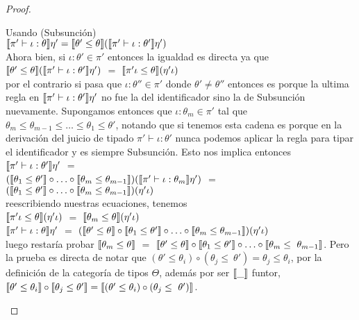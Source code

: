 \begin{proof}
\begin{itemize}
\begin{itemize}
Usando (Subsunción)\\

$\llbracket \pi' \vdash \iota : \theta \rrbracket\eta' = 
\llbracket \theta' \leq \theta \rrbracket (\llbracket \pi' \vdash \iota : \theta' \rrbracket\eta')$\\

Ahora bien, si $\iota:\theta' \in \pi'$ entonces la igualdad es directa ya que\\

$\llbracket \theta' \leq \theta \rrbracket (\llbracket \pi' \vdash \iota : \theta' \rrbracket\eta')$ $=$
$\llbracket \pi'\iota \leq \theta \rrbracket (\eta'\iota)$\\

por el contrario si pasa que $\iota:\theta'' \in \pi'$ donde $\theta' \neq \theta''$
entonces es porque la ultima regla en $\llbracket \pi' \vdash \iota : \theta' \rrbracket\eta'$
no fue la del identificador sino la de Subsunción nuevamente. Supongamos entonces
que $\iota:\theta_m \in \pi'$ tal que 
$\theta_m \leq \theta_{m-1} \leq \ldots \leq \theta_1 \leq \theta'$, notando que
si tenemos esta cadena es porque en la derivaci\'on del juicio de tipado 
$\pi' \vdash \iota : \theta'$ nunca podemos aplicar la regla para tipar el identificador
y es siempre Subsunción. Esto nos implica entonces\\

$\llbracket \pi' \vdash \iota : \theta' \rrbracket\eta'$ $=$\\
$(\llbracket \theta_1 \leq \theta' \rrbracket \circ 
\ldots 
\circ \llbracket \theta_m \leq \theta_{m-1} \rrbracket)
		(\llbracket \pi' \vdash \iota : \theta_m \rrbracket\eta')$ $=$\\
$(\llbracket \theta_1 \leq \theta' \rrbracket \circ 
\ldots 
\circ \llbracket \theta_m \leq \theta_{m-1} \rrbracket)(\eta'\iota)$\\

reescribiendo nuestras ecuaciones, tenemos\\

$\llbracket \pi'\iota \leq \theta \rrbracket(\eta' \iota)$ $=$ 
$\llbracket \theta_m \leq \theta \rrbracket(\eta' \iota)$\\

$\llbracket \pi' \vdash \iota : \theta \rrbracket\eta'$ $=$
$(\llbracket \theta' \leq \theta \rrbracket \circ 
\llbracket \theta_1 \leq \theta' \rrbracket \circ 
\ldots 
\circ \llbracket \theta_m \leq \theta_{m-1} \rrbracket)(\eta'\iota)$\\

luego restar\'ia probar $\llbracket \theta_m \leq \theta \rrbracket$ $=$
$\llbracket \theta' \leq \theta \rrbracket \circ 
\llbracket \theta_1 \leq \theta' \rrbracket \circ 
\ldots 
\circ \llbracket \theta_m \leq ~ \theta_{m-1} \rrbracket$.
Pero la prueba es directa de notar que 
$(\theta' \leq \theta_i) \circ (\theta_j \leq ~ \theta') = \theta_j \leq \theta_i$,
por la definici\'on de la categor\'ia de tipos $\Theta$, adem\'as
por ser $\llbracket \_ \rrbracket$ funtor, 
$\llbracket \theta' \leq \theta_i \rrbracket \circ \llbracket \theta_j \leq \theta' \rrbracket = 
\llbracket (\theta' \leq \theta_i) \circ (\theta_j \leq ~ \theta') \rrbracket$.


\end{itemize}
\end{itemize}
\end{proof}
